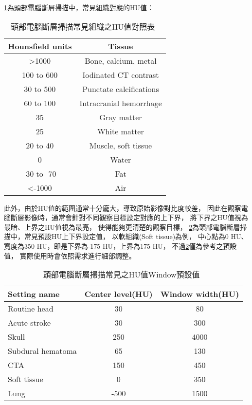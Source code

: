 \documentclass[class=NCU_thesis, crop=false]{standalone}
\begin{document}
\cref{table:table-hu-of-common-tissues-from-head}為頭部電腦斷層掃描中，常見組織對應的HU值：
\begin{table}[h]
    \centering
    \caption{頭部電腦斷層掃描常見組織之HU值對照表~\cite{levCTAngiographyCT2002}}
    \label{table:table-hu-of-common-tissues-from-head}
    \begin{tabular}{cc}
    \hline
    Hounsfield units & Tissue \\
    \hline
    >1000 & Bone, calcium, metal \\
    100 to 600 & Iodinated CT contrast \\
    30 to 500 & Punctate calcifications \\
    60 to 100 & Intracranial hemorrhage \\
    35 & Gray matter \\
    25 & White matter \\
    20 to 40 & Muscle, soft tissue \\
    0 & Water \\
    -30 to -70 & Fat \\
    <-1000 & Air \\
    \hline
    \end{tabular}
\end{table}

此外，由於HU值的範圍通常十分龐大，導致原始影像對比度較差，
因此在觀察電腦斷層影像時，通常會針對不同觀察目標設定對應的上下界，
將下界之HU值視為最暗、上界之HU值視為最亮，
使得能夠更清楚的觀察目標，
\cref{table:table-hu-common-setting-from-head}為頭部電腦斷層掃描中，常見預設HU上下界設定值，
以軟組織(Soft tissue)為例，
中心點為0 HU、寬度為350 HU，即是下界為-175 HU，上界為175 HU，
不過\cref{table:table-hu-common-setting-from-head}僅為參考之預設值，
實際使用時會依照需求進行細部調整。

\begin{table}[h]
    \centering
    \caption{頭部電腦斷層掃描常見之HU值Window預設值~\cite{levCTAngiographyCT2002}}
    \label{table:table-hu-common-setting-from-head}
    \begin{tabular}{lcc}
    \hline
    Setting name & Center level(HU) & Window width(HU) \\
    \hline
    Routine head & 30 & 80 \\
    Acute stroke & 30 & 300 \\
    Skull & 250 & 4000 \\
    Subdural hematoma & 65 & 130 \\
    CTA & 150 & 450 \\
    Soft tissue & 0 & 350 \\
    Lung & -500 & 1500 \\
    \hline
    \end{tabular}
\end{table}
\end{document}
